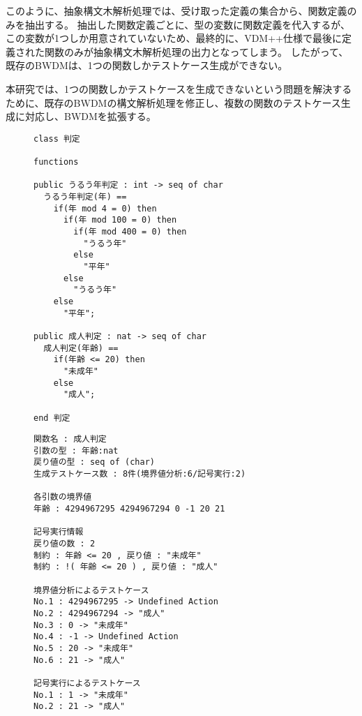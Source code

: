 \documentclass[uplatex, report, a4j, 10pt]{jsbook}
\newcommand{\tool}{BWDM}
\begin{document}
このように、抽象構文木解析処理では、受け取った定義の集合から、関数定義のみを抽出する。
抽出した関数定義ごとに、\TCExplicitFunctionDefinition{}型の変数に関数定義を代入するが、
この変数が1つしか用意されていないため、最終的に、VDM++仕様で最後に定義された関数のみが抽象構文木解析処理の出力となってしまう。
したがって、既存のBWDMは、1つの関数しかテストケース生成ができない。

本研究では、1つの関数しかテストケースを生成できないという問題を解決するために、既存の\tool{}の構文解析処理を修正し、複数の関数のテストケース生成に対応し、\tool{}を拡張する。

\lstset{language=}
\begin{figure}[tp]
  \begin{lstlisting}[caption=複数の関数を含むVDM++仕様,label=fig:func_multiple]
class 判定

functions

public うるう年判定 : int -> seq of char
  うるう年判定(年) ==
    if(年 mod 4 = 0) then
      if(年 mod 100 = 0) then
        if(年 mod 400 = 0) then
          "うるう年"
        else
          "平年"
      else
        "うるう年"
    else
      "平年";

public 成人判定 : nat -> seq of char
  成人判定(年齢) ==
    if(年齢 <= 20) then
      "未成年"
    else
      "成人";

end 判定
\end{lstlisting}
\end{figure}

\lstset{language=}
\begin{figure}[tp]
  \begin{lstlisting}[caption=複数の関数を含むVDM++仕様(コード\ref{fig:func_multiple})を既存のBWDMに適用した際の出力,label=fig:func_multiple_result]
関数名 : 成人判定
引数の型 : 年齢:nat 
戻り値の型 : seq of (char)
生成テストケース数 : 8件(境界値分析:6/記号実行:2)

各引数の境界値
年齢 : 4294967295 4294967294 0 -1 20 21 

記号実行情報
戻り値の数 : 2
制約 : 年齢 <= 20 , 戻り値 : "未成年"
制約 : !( 年齢 <= 20 ) , 戻り値 : "成人"

境界値分析によるテストケース
No.1 : 4294967295 -> Undefined Action
No.2 : 4294967294 -> "成人"
No.3 : 0 -> "未成年"
No.4 : -1 -> Undefined Action
No.5 : 20 -> "未成年"
No.6 : 21 -> "成人"

記号実行によるテストケース
No.1 : 1 -> "未成年"
No.2 : 21 -> "成人"
\end{lstlisting}
\end{figure}
\end{document}
